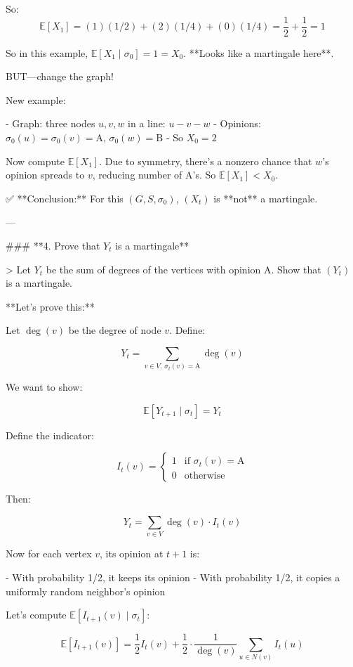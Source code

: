\begin{enumerate}
\begin{shaded}
\begin{enumerate}
So:
\[
\mathbb{E}[X_1] = (1)(1/2) + (2)(1/4) + (0)(1/4) = \frac{1}{2} + \frac{1}{2} = 1
\]

So in this example, \( \mathbb{E}[X_1 \mid \sigma_0] = 1 = X_0 \). **Looks like a martingale here**.

BUT—change the graph!

New example:

- Graph: three nodes \( u, v, w \) in a line: \( u - v - w \)
- Opinions: \( \sigma_0(u) = \sigma_0(v) = \text{A} \), \( \sigma_0(w) = \text{B} \)
- So \( X_0 = 2 \)

Now compute \( \mathbb{E}[X_1] \). Due to symmetry, there's a nonzero chance that \( w \)'s opinion spreads to \( v \), reducing number of A's. So \( \mathbb{E}[X_1] < X_0 \).

✅ **Conclusion:** For this \( (G, S, \sigma_0) \), \( (X_t) \) is **not** a martingale.

---

### **4. Prove that \( Y_t \) is a martingale**

> Let \( Y_t \) be the sum of degrees of the vertices with opinion A. Show that \( (Y_t) \) is a martingale.

**Let's prove this:**

Let \( \deg(v) \) be the degree of node \( v \). Define:

\[
Y_t = \sum_{v \in V,\, \sigma_t(v) = \text{A}} \deg(v)
\]

We want to show:

\[
\mathbb{E}[Y_{t+1} \mid \sigma_t] = Y_t
\]

Define the indicator:

\[
I_t(v) = 
\begin{cases}
1 & \text{if } \sigma_t(v) = \text{A} \\
0 & \text{otherwise}
\end{cases}
\]

Then:

\[
Y_t = \sum_{v \in V} \deg(v) \cdot I_t(v)
\]

Now for each vertex \( v \), its opinion at \( t+1 \) is:

- With probability 1/2, it keeps its opinion
- With probability 1/2, it copies a uniformly random neighbor's opinion

Let's compute \( \mathbb{E}[I_{t+1}(v) \mid \sigma_t] \):

\[
\mathbb{E}[I_{t+1}(v)] = \frac{1}{2} I_t(v) + \frac{1}{2} \cdot \frac{1}{\deg(v)} \sum_{u \in N(v)} I_t(u)
\]


\end{enumerate}
\end{shaded}
\end{enumerate}
